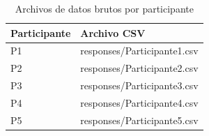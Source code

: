 \documentclass[stu, 12pt, letterpaper, donotrepeattitle, floatsintext, natbib]{apa7}
\begin{document}
\begin{table}[H]
\centering
\caption{Archivos de datos brutos por participante}
\label{tab:apendice_csv}
\begin{tabular}{ll}
\toprule
\textbf{Participante} & \textbf{Archivo CSV} \\
\midrule
P1 & responses/Participante1.csv \\
P2 & responses/Participante2.csv \\
P3 & responses/Participante3.csv \\
P4 & responses/Participante4.csv \\
P5 & responses/Participante5.csv \\
\bottomrule
\end{tabular}
\end{table}



\end{document}
